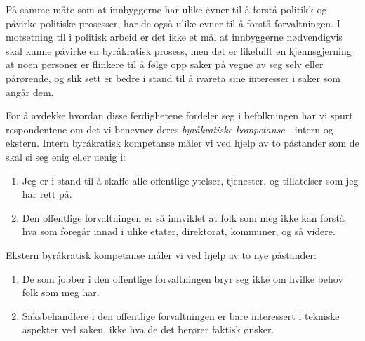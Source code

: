\documentclass[
  12pt,
  a4paper, 12pt]{article}
\begin{document}
På samme måte som at innbyggerne har ulike evner til å forstå politikk og påvirke politiske prosesser, har de også ulike evner til å forstå forvaltningen.
I motsetning til i politisk arbeid er det ikke et mål at innbyggerne nødvendigvis skal kunne påvirke en byråkratisk prosess, men det er likefullt en kjennsgjerning at noen personer er flinkere til å følge opp saker på vegne av seg selv eller pårørende, og slik sett er bedre i stand til å ivareta sine interesser i saker som angår dem.

For å avdekke hvordan disse ferdighetene fordeler seg i befolkningen har vi spurt respondentene om det vi benevner deres \emph{byråkratiske kompetanse} - intern og ekstern.
Intern byråkratisk kompetanse måler vi ved hjelp av to påstander som de skal si seg enig eller uenig i:

\begin{enumerate}
\def\labelenumi{\arabic{enumi}.}
\item
  Jeg er i stand til å skaffe alle offentlige ytelser, tjenester, og tillatelser som jeg har rett på.
\item
  Den offentlige forvaltningen er så innviklet at folk som meg ikke kan forstå hva som foregår innad i ulike etater, direktorat, kommuner, og så videre.
\end{enumerate}

Ekstern byråkratisk kompetanse måler vi ved hjelp av to nye påstander:

\begin{enumerate}
\def\labelenumi{\arabic{enumi}.}
\item
  De som jobber i den offentlige forvaltningen bryr seg ikke om hvilke behov folk som meg har.
\item
  Saksbehandlere i den offentlige forvaltningen er bare interessert i tekniske aspekter ved saken, ikke hva de det berører faktisk ønsker.
\end{enumerate}
\end{document}
